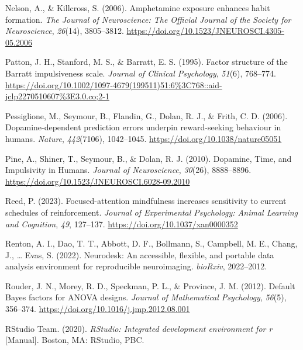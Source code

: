\documentclass[
  man]{apa6}
\newlength{\cslhangindent}
\newlength{\cslentryspacingunit} %
\newenvironment{CSLReferences}[2] %
 {%
  \setlength{\parindent}{0pt}
  \ifodd #1
  \let\oldpar\par
  \def\par{\hangindent=\cslhangindent\oldpar}
  \fi
  \setlength{\parskip}{#2\cslentryspacingunit}
 }%
 {}
\begin{document}
\begin{CSLReferences}{1}{0}
\leavevmode{}%
Nelson, A., \& Killcross, S. (2006). Amphetamine exposure enhances habit formation. \emph{The Journal of Neuroscience: The Official Journal of the Society for Neuroscience}, \emph{26}(14), 3805--3812. \url{https://doi.org/10.1523/JNEUROSCI.4305-05.2006}

\leavevmode{}%
Patton, J. H., Stanford, M. S., \& Barratt, E. S. (1995). Factor structure of the {Barratt} impulsiveness scale. \emph{Journal of Clinical Psychology}, \emph{51}(6), 768--774. \url{https://doi.org/10.1002/1097-4679(199511)51:6\%3C768::aid-jclp2270510607\%3E3.0.co;2-1}

\leavevmode{}%
Pessiglione, M., Seymour, B., Flandin, G., Dolan, R. J., \& Frith, C. D. (2006). Dopamine-dependent prediction errors underpin reward-seeking behaviour in humans. \emph{Nature}, \emph{442}(7106), 1042--1045. \url{https://doi.org/10.1038/nature05051}

\leavevmode{}%
Pine, A., Shiner, T., Seymour, B., \& Dolan, R. J. (2010). Dopamine, {Time}, and {Impulsivity} in {Humans}. \emph{Journal of Neuroscience}, \emph{30}(26), 8888--8896. \url{https://doi.org/10.1523/JNEUROSCI.6028-09.2010}

\leavevmode{}%
Reed, P. (2023). Focused-attention mindfulness increases sensitivity to current schedules of reinforcement. \emph{Journal of Experimental Psychology: Animal Learning and Cognition}, \emph{49}, 127--137. \url{https://doi.org/10.1037/xan0000352}

\leavevmode{}%
Renton, A. I., Dao, T. T., Abbott, D. F., Bollmann, S., Campbell, M. E., Chang, J., \ldots{} Evas, S. (2022). Neurodesk: {An} accessible, flexible, and portable data analysis environment for reproducible neuroimaging. \emph{bioRxiv}, 2022--2012.

\leavevmode{}%
Rouder, J. N., Morey, R. D., Speckman, P. L., \& Province, J. M. (2012). Default {Bayes} factors for {ANOVA} designs. \emph{Journal of Mathematical Psychology}, \emph{56}(5), 356--374. \url{https://doi.org/10.1016/j.jmp.2012.08.001}

\leavevmode{}%
RStudio Team. (2020). \emph{{RStudio}: {Integrated} development environment for r} {[}Manual{]}. {Boston, MA}: {RStudio, PBC.}


\end{CSLReferences}
\end{document}
